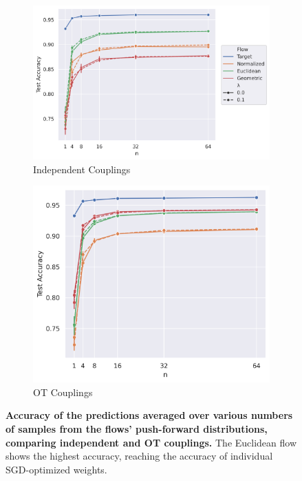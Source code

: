 \begin{figure}[t!]
    \centering
    \begin{subfigure}{0.55\linewidth}
        \centering
        \includegraphics[width=\linewidth]{figures/mnist/mnist_model_averaging.png}
        \caption{Independent Couplings}
    \end{subfigure}
    \begin{subfigure}{0.43\linewidth}
        \centering
        \includegraphics[width=\linewidth]{figures/mnist/mnist_model_averaging_OT.png}
        \caption{OT Couplings}
    \end{subfigure}
    \caption{\label{fig:mnist_averaging}\textbf{Accuracy of the predictions averaged over various numbers of samples from the flows' push-forward distributions, comparing independent and OT couplings.} The Euclidean flow shows the highest accuracy, reaching the accuracy of individual SGD-optimized weights.} 
\end{figure}

